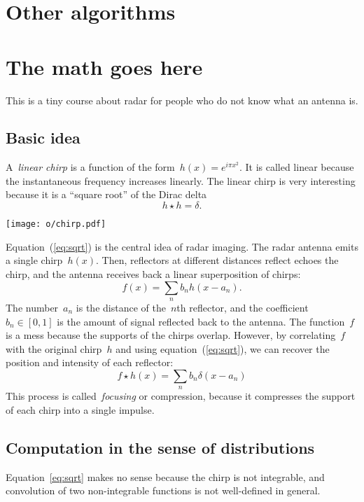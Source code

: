 \documentclass[a4paper]{article}           %
\newcommand{\1}{\mathbf{1}}
\begin{document}
\section{Other algorithms}

\clearpage
\appendix
\section{The math goes here}

This is a tiny course about radar for people who do not know what an antenna
is.

\subsection{Basic idea}
A~\emph{linear chirp} is a function of the form~$h(x)=e^{i\pi x^2}$.  It is
called linear because the instantaneous frequency increases linearly.
The linear chirp is very interesting because it is a ``square root'' of
the Dirac delta
\begin{equation}
	h\star h=\delta.
	\label{eq:sqrt}
\end{equation}

\texttt{[image: o/chirp.pdf]}

Equation~(\ref{eq:sqrt}) is the central idea of radar imaging.  The radar
antenna emits a single chirp~$h(x)$.  Then, reflectors at different distances
reflect echoes the chirp, and the antenna receives back a linear
superposition of chirps:
$$
f(x)=\sum_n b_n h(x-a_n).
$$
The number~$a_n$ is the distance of the~$n$th reflector, and the
coefficient~$b_n\in[0,1]$ is the amount of signal reflected back to the
antenna.
The function~$f$ is a mess because the supports of the chirps overlap.
However, by correlating~$f$ with the original chirp~$h$ and
using equation~(\ref{eq:sqrt}), we can recover the position and intensity of
each reflector:
$$
f\star h (x) = \sum_n b_n \delta(x - a_n)
$$
This process is called~\emph{focusing} or compression, because it
compresses the support of each chirp into a single impulse.

\subsection{Computation in the sense of distributions}
Equation~\ref{eq:sqrt} makes no sense because the chirp is not integrable,
and convolution of two non-integrable functions is not well-defined
in general.
\end{document}
